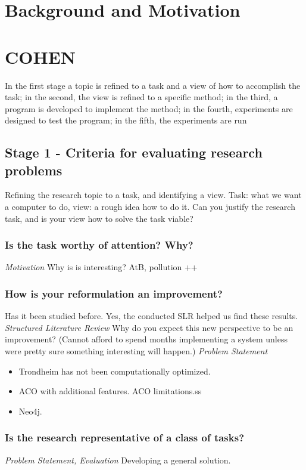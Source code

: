 \section{Background and Motivation}

\section{COHEN}

In the first stage a topic is refined to a task and a view of how to accomplish the task; in the second, the view is refined to a specific method; in the third, a program is developed to implement the method; in the fourth, experiments are designed to test the program; in the fifth, the experiments are run\citep{cohen88}

\subsection{Stage 1 - Criteria for evaluating research problems}
Refining the research topic to a task, and identifying a view.
Task: what we want a computer to do, view: a rough idea how to do it. Can you justify the research task, and is your view how to solve the task viable? 

\subsubsection{Is the task worthy of attention? Why?}
\emph{\color{orange} Motivation}
Why is is interesting? AtB, pollution ++ 

\subsubsection{How is your reformulation an improvement?}
Has it been studied before. Yes, the conducted SLR helped us find these results.\emph{\color{orange} Structured Literature Review}
Why do you expect this new perspective to be an improvement? (Cannot afford to spend months implementing a system unless were pretty sure something interesting will happen.)\emph{\color{orange} Problem Statement}
\begin{itemize}
\item Trondheim has not been computationally optimized.
\item ACO with additional features. ACO limitations.ss
\item Neo4j.
\end{itemize}

\subsubsection{Is the research representative of a class of tasks?}
\emph{\color{orange} Problem Statement, Evaluation}
Developing a general solution.

